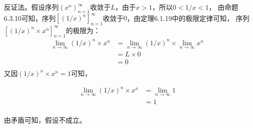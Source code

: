 \documentclass{article}
\theoremstyle{mystyle}
\begin{document}
反证法。假设序列$(x^n)_{n=1}^\infty$收敛于$L$，由于$x>1$，所以$0< 1/x < 1$，
由命题6.3.10可知，序列$[(1/x)^n]_{n=1}^\infty$收敛于$0$，由定理6.1.19中的极限定律可知，
序列$[(1/x)^n \times x^n]_{n=1}^\infty$的极限为：
\begin{align*}
  \lim\limits_{n \to \infty} (1/x)^n \times x^n & = \lim\limits_{n \to \infty} (1/x)^n \times \lim\limits_{n \to \infty} x^n \\
                                                & = L \times 0                                                               \\
                                                & = 0                                                                        \\
\end{align*}
又因$(1/x)^n \times x^n = 1$可知，

\begin{align*}
  \lim\limits_{n \to \infty} (1/x)^n \times x^n & = \lim\limits_{n \to \infty} 1 \\
                                                & = 1                            \\
\end{align*}

由矛盾可知，假设不成立。
\end{document}
